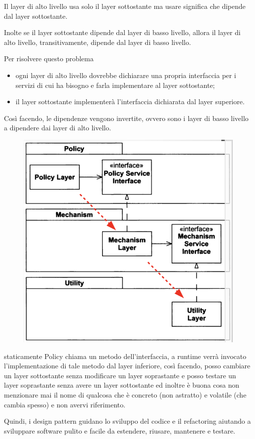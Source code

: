 Il layer di alto livello usa solo il layer sottostante ma usare significa che dipende dal layer sottostante.

Inolte se il layer sottostante dipende dal layer di basso livello, allora il layer di alto livello, transitivamente, dipende dal layer di basso livello.

Per risolvere questo problema
\begin{itemize}
  \item ogni layer di alto livello dovrebbe dichiarare una propria interfaccia per i servizi di cui ha bisogno e farla implementare al layer sottostante;
  \item il layer sottostante implementerà l'interfaccia dichiarata dal layer superiore.
\end{itemize}

Così facendo, le dipendenze vengono invertite, ovvero sono i layer di basso livello a dipendere dai layer di alto livello.
\begin{figure}[H]
  \centering
  \includegraphics[width=0.35\linewidth]{../../immagini/principio_SOLID/architetturaOODIP}  
\end{figure}

staticamente Policy chiama un metodo dell'interfaccia, a runtime verrà invocato l'implementazione di tale metodo dal layer inferiore, così facendo, posso cambiare un
layer sottostante senza modificare un layer soprastante e posso testare un layer soprastante senza avere un layer sottostante ed inoltre è buona cosa non menzionare 
mai il nome di qualcosa che è concreto (non astratto) e volatile (che cambia spesso) e non avervi riferimento.

Quindi, i design pattern guidano lo sviluppo del codice e il refactoring aiutando a sviluppare software pulito e facile da estendere, riusare, mantenere e testare.